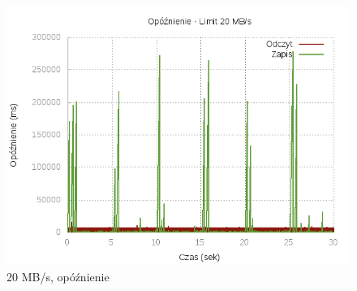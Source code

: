 \begin{figure}[h]
	\centering
	\includegraphics[scale=0.9]{results/20_lat.png}
		\caption{20 MB/s, opóźnienie}
    \label{fig:20-lat}
\end{figure}

